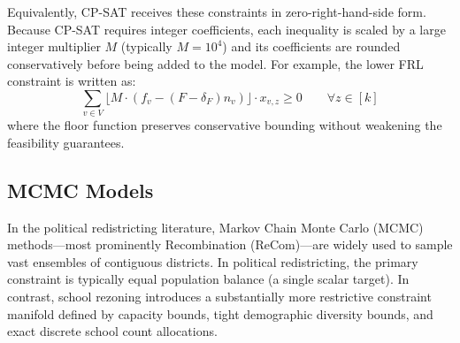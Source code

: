 \documentclass{article}
\begin{document}
Equivalently, CP-SAT receives these constraints in zero-right-hand-side form. Because CP-SAT requires integer coefficients, each inequality is scaled by a large integer multiplier $M$ (typically $M = 10^4$) and its coefficients are rounded conservatively before being added to the model. For example, the lower FRL constraint is written as:
\begin{equation*}
\sum_{v\in V}
\lfloor M \cdot \left(f_v-(F-\delta_F)n_v\right) \rfloor \cdot x_{v,z}
\geq 0 \qquad \forall z \in [k]
\end{equation*}
where the floor function preserves conservative bounding without weakening the feasibility guarantees.

\subsection{MCMC Models}
In the political redistricting literature, Markov Chain Monte Carlo (MCMC) methods—most prominently Recombination (ReCom)—are widely used to sample vast ensembles of contiguous districts. In political redistricting, the primary constraint is typically equal population balance (a single scalar target). In contrast, school rezoning introduces a substantially more restrictive constraint manifold defined by capacity bounds, tight demographic diversity bounds, and exact discrete school count allocations.
\end{document}
